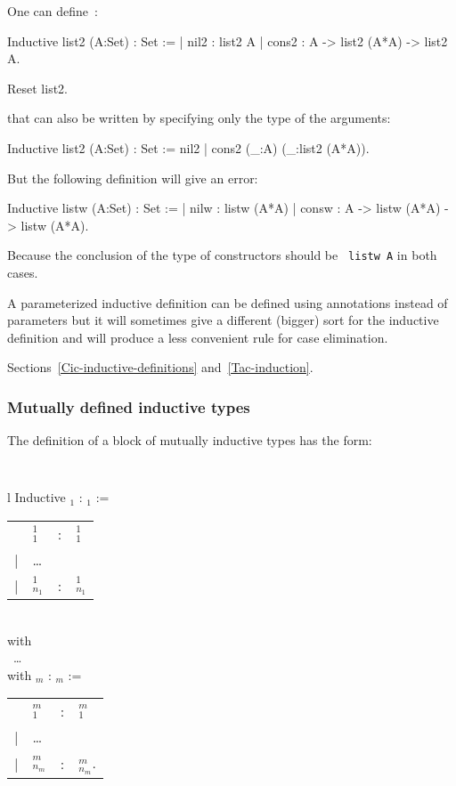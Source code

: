 One can define~:
\begin{coq_example}
Inductive list2 (A:Set) : Set :=
  | nil2 : list2 A
  | cons2 : A -> list2 (A*A) -> list2 A.
\end{coq_example}
\begin{coq_eval}
Reset list2.
\end{coq_eval}
that can also be written by specifying only the type of the arguments:
\begin{coq_example*}
Inductive list2 (A:Set) : Set := nil2 | cons2 (_:A) (_:list2 (A*A)).
\end{coq_example*}
But the following definition will give an error:
\begin{coq_example}
Inductive listw (A:Set) : Set :=
  | nilw : listw (A*A)
  | consw : A -> listw (A*A) -> listw (A*A).
\end{coq_example}
Because the conclusion of the type of constructors should be {\tt
  listw A} in both cases. 

A parameterized inductive definition can be defined using
annotations instead of parameters but it will sometimes give a
different (bigger) sort for the inductive definition and will produce
a less convenient rule for case elimination.

\SeeAlso Sections~\ref{Cic-inductive-definitions} and~\ref{Tac-induction}.


\subsubsection{Mutually defined inductive types
\label{Mutual-Inductive}}

The definition of a block of mutually inductive types has the form:

\medskip
{\tt 
\begin{tabular}{l}
Inductive {\ident$_1$} : {\type$_1$} :=  \\
\begin{tabular}{clcl}
   & {\ident$_1^1$}     &:& {\type$_1^1$} \\
 | & {\ldots} && \\
 | & {\ident$_{n_1}^1$} &:& {\type$_{n_1}^1$}
\end{tabular}  \\
with\\
~{\ldots} \\
with {\ident$_m$} : {\type$_m$} := \\
\begin{tabular}{clcl}
   & {\ident$_1^m$}     &:& {\type$_1^m$} \\
 | & {\ldots} \\
 | & {\ident$_{n_m}^m$} &:& {\type$_{n_m}^m$}.
\end{tabular}
\end{tabular}
}
\medskip

